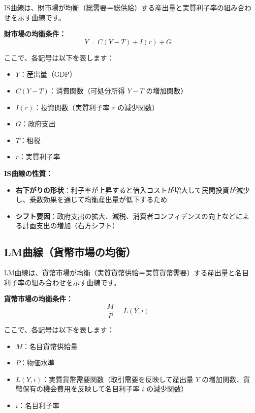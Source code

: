 \documentclass[
  japanese,
  lualatex,
  ja=standard,
  12pt,
  a4paper]{ltjsarticle}
\providecommand{\tightlist}{%
  \setlength{\itemsep}{0pt}\setlength{\parskip}{0pt}}
\begin{document}
IS曲線は、財市場が均衡（総需要＝総供給）する産出量と実質利子率の組み合わせを示す曲線です。


\textbf{財市場の均衡条件：} \[
Y = C(Y - T) + I(r) + G
\]

ここで、各記号は以下を表します：

\begin{itemize}
\tightlist
\item
  \(Y\)：産出量（GDP）
\item
  \(C(Y - T)\)：消費関数（可処分所得 \(Y-T\) の増加関数）
\item
  \(I(r)\)：投資関数（実質利子率 \(r\) の減少関数）
\item
  \(G\)：政府支出
\item
  \(T\)：租税
\item
  \(r\)：実質利子率
\end{itemize}


\textbf{IS曲線の性質：}

\begin{itemize}
\tightlist
\item
  \textbf{右下がりの形状}：利子率が上昇すると借入コストが増大して民間投資が減少し、乗数効果を通じて均衡産出量が低下するため
\item
  \textbf{シフト要因}：政府支出の拡大、減税、消費者コンフィデンスの向上などによる計画支出の増加（右方シフト）
\end{itemize}

\subsection{LM曲線（貨幣市場の均衡）}\label{lmux66f2ux7ddaux8ca8ux5e63ux5e02ux5834ux306eux5747ux8861}

LM曲線は、貨幣市場が均衡（実質貨幣供給＝実質貨幣需要）する産出量と名目利子率の組み合わせを示す曲線です。


\textbf{貨幣市場の均衡条件：} \[
\frac{M}{P} = L(Y, i)
\]

ここで、各記号は以下を表します：

\begin{itemize}
\tightlist
\item
  \(M\)：名目貨幣供給量
\item
  \(P\)：物価水準
\item
  \(L(Y, i)\)：実質貨幣需要関数（取引需要を反映して産出量 \(Y\)
  の増加関数、貨幣保有の機会費用を反映して名目利子率 \(i\) の減少関数）
\item
  \(i\)：名目利子率
\end{itemize}
\end{document}
